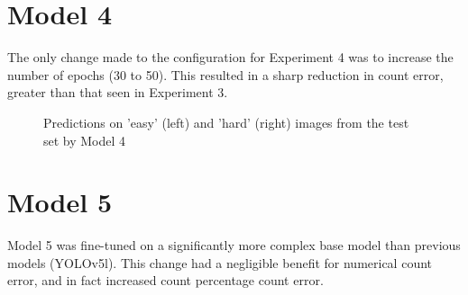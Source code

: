 \section{Model 4}
The only change made to the configuration for Experiment 4 was to increase the number of epochs (30 to 50). This resulted in a sharp reduction in count error, greater than that seen in Experiment 3. 

\begin{figure}
\caption{Predictions on 'easy' (left) and 'hard' (right) images from the test set by Model 4}
\label{model4}
\end{figure}

\section{Model 5}
Model 5 was fine-tuned on a significantly more complex base model than previous models (YOLOv5l). This change had a negligible benefit for numerical count error, and in fact increased count percentage count error.

